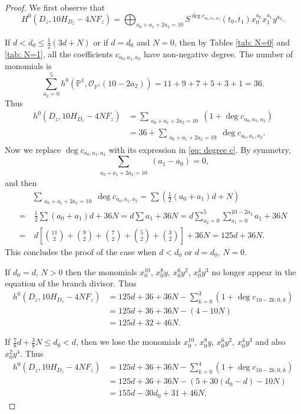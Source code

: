 \documentclass[a4paper,11pt]{amsart}
\newcommand{\PP}{\ensuremath{\mathbb{P}}}
\def\hol{{\mathcal{O}}}
\theoremstyle{definition}
\theoremstyle{remark}
\numberwithin{equation}{section}
\begin{document}
\begin{proof}
	We first observe that
	\begin{equation} \label{eq: decompose-10H}
		H^0(D_z,10H_{D_z}-4NF_z)=\bigoplus_{a_0+a_1+2a_2=10} S^{\deg c_{a_0,a_1,a_2}}(t_0,t_1)x_0^{a_0}x_1^{a_1}y^{a_2}.
	\end{equation}
    
    If $d < d_0 \le \frac12(3d + N)$ or if $d=d_0$ and $N=0$, then by Tables \ref{tab: N=0} and \ref{tab: N=1}, all the coefficients $c_{a_0,a_1,a_2}$ have non-negative degree. The number of monomials is 
	$$
	\sum_{a_2=0}^5 h^0 \left(\PP^1,\hol_{\PP^1}(10-2a_2)\right)=11+9+7+5+3+1=36.
	$$
    Thus
    \begin{align*}
    h^0(D_z,10H_{D_z}-4NF_z) & =  \sum_{\substack{a_0 + a_1 + 2a_2 = 10}} (1 + \deg c_{a_0,a_1,a_2}) \\
	& = 36 + \sum_{\substack{a_0 + a_1 + 2a_2 = 10}} \deg c_{a_0,a_1,a_2}.
    \end{align*}
    Now we replace $\deg c_{a_0,a_1,a_2}$ with its expression in \eqref{eq: degree c}. By symmetry,
    \[
    \sum_{\substack{a_0 + a_1 + 2a_2 = 10}} (a_1-a_0)=0,
    \] 
    and then
    \begin{align*}
        & \sum_{\substack{a_0 + a_1 + 2a_2 = 10}} \deg c_{a_0,a_1,a_2} = \sum \left( \frac{1}{2} (a_0 + a_1) d +N\right) \\
        = & \ \frac{1}{2}  \sum (a_0 + a_1)d  +36N = d \sum a_1 +36N= d \sum_{a_2=0}^5 \sum_{a_1=0}^{10-2a_2} a_1 + 36N \\
        = & \ d \left[ \binom{11}2 + \binom92+ \binom72+ \binom52+ \binom32 \right]+36N=125d+36N.
    \end{align*}
	This concludes the proof of the case when $d < d_0$ or $d=d_0$, $N=0$.
    
    If $d_0 = d$, $N > 0$ then the monomials $x_0^{10}$, $x_0^8y$, $x_0^6y^2$, $x_0^4y^3$ no longer appear in the equation of the branch divisor. Thus
	\begin{align*}
		h^0(D_z, 10H_{D_z} - 4NF_z) & = 125d + 36 + 36N -\sum_{k=0}^3(1 + \deg c_{10-2k,0,k})\\
		& = 125d + 36 + 36N - \left(4  - 10N \right) \\
		& = 125d  + 32 + 46N.
	\end{align*}

	If $\frac78d + \frac38 N \le d_0 < d$, then we lose the monomials 
    $x_0^{10}$, $x_0^8y$, $x_0^6y^2$, $x_0^4y^3$ and also $x_0^2y^4$. Thus
	\begin{align*}
		h^0(D_z, 10H_{D_z} - 4NF_z) & = 125d + 36 + 36N -\sum_{k=0}^4(1 + \deg c_{10-2k,0,k})\\
		& = 125d + 36 + 36N - \left(5 + 30(d_0-d) - 10N \right) \\
		& = 155d - 30d_0 + 31 + 46N.
	\end{align*}


\end{proof}
\end{document}
